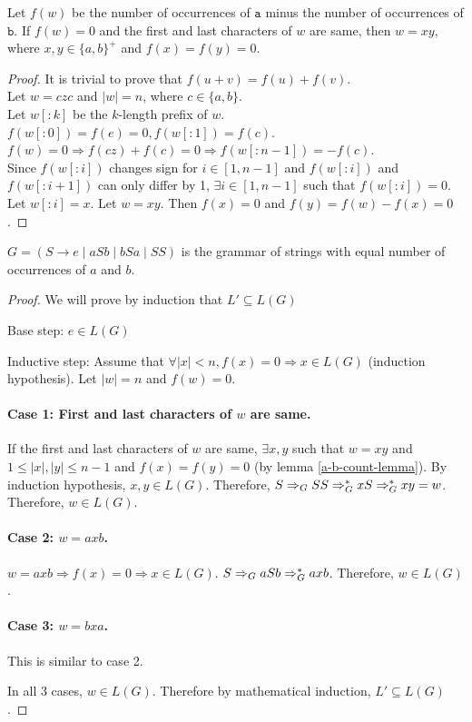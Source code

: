 \begin{lemma}
\label{a-b-count-lemma}
Let $f(w)$ be the number of occurrences of $\texttt{a}$ minus the number of occurrences of $\texttt{b}$.
If $f(w) = 0$ and the first and last characters of $w$ are same, then
$w = xy$, where $x, y \in \{a, b\}^+$ and $f(x) = f(y) = 0$.
\end{lemma}
\begin{proof}
It is trivial to prove that $f(u + v) = f(u) + f(v)$.\\
Let $w = czc$ and $|w| = n$, where $c \in \{a, b\}$.\\
Let $w[:k]$ be the $k$-length prefix of $w$.\\
$f(w[:0]) = f(e) = 0, f(w[:1]) = f(c)$.\\
$f(w) = 0 \Rightarrow f(cz) + f(c) = 0 \Rightarrow f(w[:n-1]) = -f(c)$.\\
Since $f(w[:i])$ changes sign for $i \in [1, n-1]$ and $f(w[:i])$ and $f(w[:i+1])$
can only differ by 1, $\exists i \in [1, n-1]$ such that $f(w[:i]) = 0$.\\
Let $w[:i] = x$. Let $w = xy$.
Then $f(x) = 0$ and $f(y) = f(w) - f(x) = 0$.
\end{proof}

\begin{theorem}
$G = (S \rightarrow e \mid aSb \mid bSa \mid SS)$ is the grammar of strings with
equal number of occurrences of $a$ and $b$.
\end{theorem}
\begin{proof}
We will prove by induction that $L' \subseteq L(G)$

Base step: $e \in L(G)$

Inductive step:
Assume that $\forall |x| < n, f(x) = 0 \Rightarrow x \in L(G)$ (induction hypothesis).
Let $|w| = n$ and $f(w) = 0$.

\paragraph{Case 1: First and last characters of $w$ are same.}
If the first and last characters of $w$ are same,
$\exists x, y$ such that $w = xy$ and $1 \le |x|, |y| \le n-1$ and $f(x) = f(y) = 0$ (by lemma \ref{a-b-count-lemma}).
By induction hypothesis, $x, y \in L(G)$.
Therefore, $S \Rightarrow_{G} SS \Rightarrow_{G}^* xS \Rightarrow_{G}^* xy = w$.
Therefore, $w \in L(G)$.

\paragraph{Case 2: $w = axb$.}
$w = axb \Rightarrow f(x) = 0 \Rightarrow x \in L(G)$.
$S \Rightarrow_{G} aSb \Rightarrow_{G}^* axb$.
Therefore, $w \in L(G)$.

\paragraph{Case 3: $w = bxa$.}
This is similar to case 2.

In all 3 cases, $w \in L(G)$.
Therefore by mathematical induction, $L' \subseteq L(G)$.
\end{proof}

